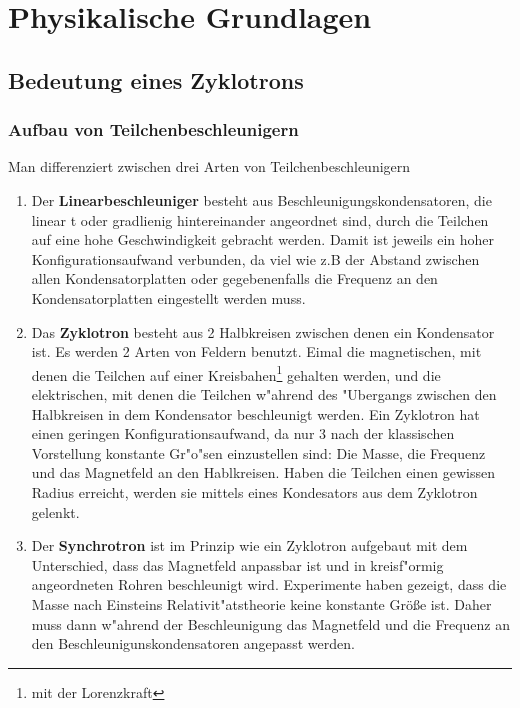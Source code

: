 \documentclass[14pt, a4paper]{report}
\begin{document}
\part{Physikalische Grundlagen}
\chapter{Bedeutung eines Zyklotrons}
\section{Aufbau von Teilchenbeschleunigern}
Man differenziert zwischen drei Arten von Teilchenbeschleunigern \footnotemark
{}
\begin{enumerate}
\item
Der \textbf{Linearbeschleuniger} besteht aus Beschleunigungskondensatoren, die linear
t oder gradlienig hintereinander angeordnet sind, durch die
Teilchen auf eine hohe Geschwindigkeit gebracht werden. Damit ist jeweils ein hoher
Konfigurationsaufwand verbunden, da viel wie z.B der Abstand zwischen allen
Kondensatorplatten oder gegebenenfalls die Frequenz an den Kondensatorplatten 
eingestellt werden muss.
\item \label{ZyklotronBeschreibungAufbau}
Das \textbf{Zyklotron} besteht aus 2 Halbkreisen zwischen denen ein Kondensator ist.
Es werden 2 Arten von Feldern benutzt. Eimal die magnetischen, mit denen die 
Teilchen auf einer Kreisbahen\footnote{mit der Lorenzkraft}
gehalten werden, und die elektrischen, 
mit denen die Teilchen w"ahrend des "Ubergangs zwischen den Halbkreisen in dem 
Kondensator beschleunigt werden. Ein Zyklotron hat einen geringen 
Konfigurationsaufwand, da nur 3 nach der klassischen Vorstellung konstante Gr"o"sen
einzustellen sind: Die Masse, die Frequenz und das Magnetfeld an den Hablkreisen. 
Haben die Teilchen einen gewissen Radius erreicht, werden sie mittels eines Kondesators
aus dem Zyklotron gelenkt.
\item
Der \textbf{Synchrotron} ist im Prinzip wie ein Zyklotron aufgebaut mit dem 
Unterschied, dass das Magnetfeld anpassbar ist und in kreisf"ormig angeordneten Rohren 
beschleunigt wird. Experimente haben gezeigt, dass die
Masse nach Einsteins Relativit"atstheorie keine konstante Größe ist. Daher muss 
dann w"ahrend der Beschleunigung das Magnetfeld und die Frequenz an den 
Beschleunigunskondensatoren angepasst werden. \label{synchrotron}
\end{enumerate}

\newpage
\end{document}
